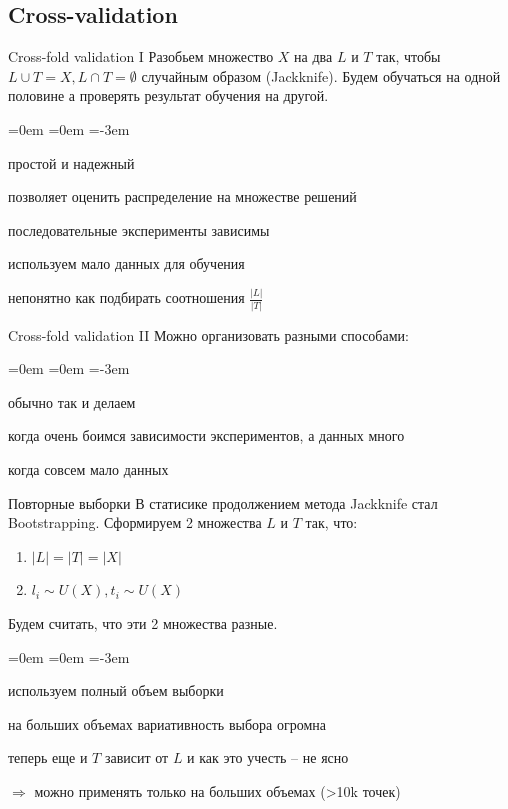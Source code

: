 \documentclass[14pt, fleqn, xcolor={dvipsnames, table}]{beamer}
\begin{document}
\subsection{Cross-validation}

\begin{frame}{Cross-fold validation I}
Разобьем множество $X$ на два $L$ и $T$ так, чтобы $L \cup T = X, L \cap T = \emptyset$ случайным образом (Jackknife).
Будем обучаться на одной половине а проверять результат обучения на другой.
\begin{description}
\itemindent=0em
=0em
\leftskip=-3em
  \item[\color{green}+] простой и надежный
  \item[\color{green}+] позволяет оценить распределение на множестве решений
  \item[\color{red}--] последовательные эксперименты зависимы
  \item[\color{red}--] используем мало данных для обучения
  \item[\color{red}--] непонятно как подбирать соотношения $\frac{|L|}{|T|}$
\end{description}
\end{frame}

\begin{frame}{Cross-fold validation II}
Можно организовать разными способами:
\begin{description}
\itemindent=0em
=0em
\leftskip=-3em
  \item[2-fold] обычно так и делаем
  \item[k-fold] когда очень боимся зависимости экспериментов, а данных много
  \item[Leave-one-out (LOO)] когда совсем мало данных
\end{description}
\end{frame}


\begin{frame}{Повторные выборки}
В статисике продолжением метода Jackknife стал Bootstrapping.
Сформируем 2 множества $L$ и $T$ так, что:
\begin{enumerate}
  \item $|L| = |T| = |X|$
  \item $l_i \sim U(X), t_i \sim U(X)$
\end{enumerate}
Будем считать, что эти 2 множества разные.
\begin{description}
\itemindent=0em
=0em
\leftskip=-3em
  \item[\color{green}+] используем полный объем выборки
  \item[\color{green}+] на больших объемах вариативность выбора огромна
  \item[\color{red}--] теперь еще и $T$ зависит от $L$ и как это учесть -- не ясно
\end{description}
$\Rightarrow$ можно применять только на больших объемах (>10k точек)
\end{frame}
\end{document}
